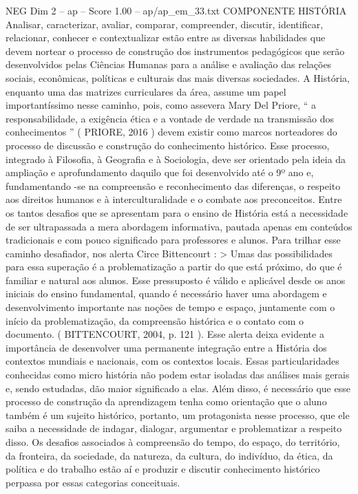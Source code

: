 \begin{textsample}{NEG Dim 2 – ap – Score 1.00 – ap/ap\_em\_33.txt}  \label{ex:f2_neg_148}
COMPONENTE HISTÓRIA Analisar, caracterizar, avaliar, comparar, compreender, discutir, identificar, relacionar, conhecer e contextualizar estão entre as diversas habilidades que devem nortear o processo de construção dos instrumentos pedagógicos que serão desenvolvidos pelas Ciências Humanas para a análise e avaliação das relações sociais, econômicas, políticas e culturais das mais diversas sociedades.
A História, enquanto uma das matrizes curriculares da área, assume um papel importantíssimo nesse caminho, pois, como assevera Mary Del Priore, “ a responsabilidade, a exigência ética e a vontade de verdade na transmissão dos conhecimentos ” ( PRIORE, 2016 ) devem existir como marcos norteadores do processo de discussão e construção do conhecimento histórico.
Esse processo, integrado à Filosofia, à Geografia e à Sociologia, deve ser orientado pela ideia da ampliação e aprofundamento daquilo que foi desenvolvido até o 9º ano e, fundamentando -se na compreensão e reconhecimento das diferenças, o respeito aos direitos humanos e à interculturalidade e o combate aos preconceitos.
Entre os tantos desafios que se apresentam para o ensino de História está a necessidade de ser ultrapassada a mera abordagem informativa, pautada apenas em conteúdos tradicionais e com pouco significado para professores e alunos.
Para trilhar esse caminho desafiador, nos alerta Circe Bittencourt : > Umas das possibilidades para essa superação é a problematização a partir do que está próximo, do que é familiar e natural aos alunos.
Esse pressuposto é válido e aplicável desde os anos iniciais do ensino fundamental, quando é necessário haver uma abordagem e desenvolvimento importante nas noções de tempo e espaço, juntamente com o início da problematização, da compreensão histórica e o contato com o documento. ( BITTENCOURT, 2004, p. 121 ).
Esse alerta deixa evidente a importância de desenvolver uma permanente integração entre a História dos contextos mundiais e nacionais, com os contextos locais.
Essas particularidades conhecidas como micro história não podem estar isoladas das análises mais gerais e, sendo estudadas, dão maior significado a elas.
Além disso, é necessário que esse processo de construção da aprendizagem tenha como orientação que o aluno também é um sujeito histórico, portanto, um protagonista nesse processo, que ele saiba a necessidade de indagar, dialogar, argumentar e problematizar a respeito disso.
Os desafios associados à compreensão do tempo, do espaço, do território, da fronteira, da sociedade, da natureza, da cultura, do indivíduo, da ética, da política e do trabalho estão aí e produzir e discutir conhecimento histórico perpassa por essas categorias conceituais.

\end{textsample}

